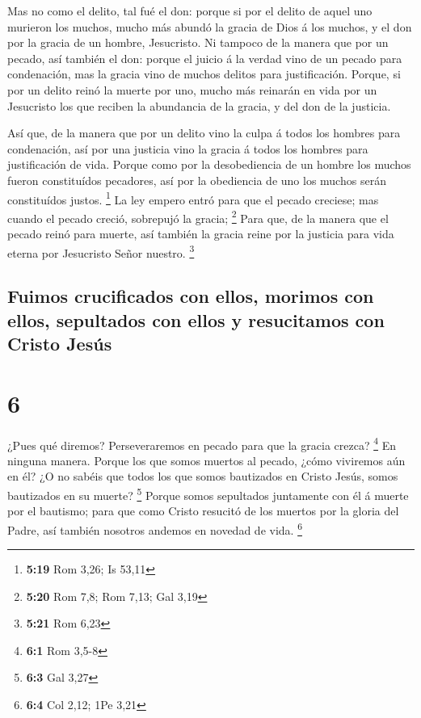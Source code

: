  Mas no como el delito, tal fué el don: porque si por el
delito de aquel uno murieron los muchos, mucho más abundó la gracia de
Dios á los muchos, y el don por la gracia de un hombre, Jesucristo.
 Ni tampoco de la manera que por un pecado, así también
el don: porque el juicio á la verdad vino de un pecado para condenación,
mas la gracia vino de muchos delitos para justificación. 
Porque, si por un delito reinó la muerte por uno, mucho más reinarán en
vida por un Jesucristo los que reciben la abundancia de la gracia, y del
don de la justicia.

 Así que, de la manera que por un delito vino la culpa á
todos los hombres para condenación, así por una justicia vino la gracia
á todos los hombres para justificación de vida.  Porque
como por la desobediencia de un hombre los muchos fueron constituídos
pecadores, así por la obediencia de uno los muchos serán constituídos
justos. \footnote{\textbf{5:19} Rom 3,26; Is 53,11}  La
ley empero entró para que el pecado creciese; mas cuando el pecado
creció, sobrepujó la gracia; \footnote{\textbf{5:20} Rom 7,8; Rom 7,13;
  Gal 3,19}  Para que, de la manera que el pecado reinó
para muerte, así también la gracia reine por la justicia para vida
eterna por Jesucristo Señor nuestro. \footnote{\textbf{5:21} Rom 6,23}

\hypertarget{fuimos-crucificados-con-ellos-morimos-con-ellos-sepultados-con-ellos-y-resucitamos-con-cristo-jesuxfas}{%
\subsection{Fuimos crucificados con ellos, morimos con ellos, sepultados
con ellos y resucitamos con Cristo
Jesús}\label{fuimos-crucificados-con-ellos-morimos-con-ellos-sepultados-con-ellos-y-resucitamos-con-cristo-jesuxfas}}

\hypertarget{section-5}{%
\section{6}\label{section-5}}

 ¿Pues qué diremos? Perseveraremos en pecado para que la
gracia crezca? \footnote{\textbf{6:1} Rom 3,5-8}  En
ninguna manera. Porque los que somos muertos al pecado, ¿cómo viviremos
aún en él?  ¿O no sabéis que todos los que somos
bautizados en Cristo Jesús, somos bautizados en su muerte? \footnote{\textbf{6:3}
  Gal 3,27}  Porque somos sepultados juntamente con él á
muerte por el bautismo; para que como Cristo resucitó de los muertos por
la gloria del Padre, así también nosotros andemos en novedad de vida.
\footnote{\textbf{6:4} Col 2,12; 1Pe 3,21}

